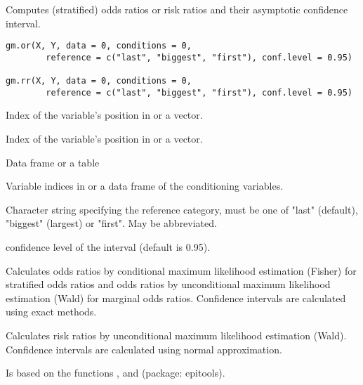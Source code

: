 \begin{Description}\relax
Computes (stratified) odds ratios or risk ratios and their asymptotic confidence interval.
\end{Description}
\begin{Usage}
\begin{verbatim}
gm.or(X, Y, data = 0, conditions = 0,
        reference = c("last", "biggest", "first"), conf.level = 0.95)

gm.rr(X, Y, data = 0, conditions = 0,
        reference = c("last", "biggest", "first"), conf.level = 0.95)
\end{verbatim}
\end{Usage}
\begin{Arguments}
\begin{ldescription}
\item[\code{X}] Index of the variable's position in  or a vector. 
\item[\code{Y}] Index of the variable's position in  or a vector. 
\item[\code{data}] Data frame or a table 
\item[\code{conditions}] Variable indices in  or a data frame of the conditioning variables. 
\item[\code{reference}] Character string specifying the reference category, 
must be one of "last" (default), "biggest" (largest) or "first". 
May be abbreviated. 
\item[\code{conf.level}] confidence level of the interval (default is 0.95). 
\end{ldescription}
\end{Arguments}
\begin{Details}\relax
Calculates odds ratios by conditional maximum likelihood estimation (Fisher) for stratified odds ratios and
odds ratios by unconditional maximum likelihood estimation (Wald) for marginal odds ratios. 
Confidence intervals are calculated using exact methods.

Calculates risk ratios by unconditional maximum likelihood estimation (Wald). 
Confidence intervals are calculated using normal approximation.

Is based on the functions ,  and  (package: epitools).
\end{Details}
